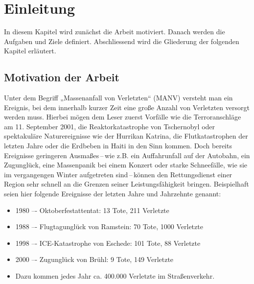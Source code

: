 \chapter{Einleitung}

In diesem Kapitel wird zunächst die Arbeit motiviert. Danach werden die Aufgaben und
Ziele definiert. Abschliessend wird die Gliederung der folgenden Kapitel erläutert.

\section{Motivation der Arbeit}
Unter dem Begriff „Massenanfall von Verletzten“ (MANV) versteht man ein Ereignis, bei dem innerhalb
kurzer Zeit eine große Anzahl von Verletzten versorgt werden muss. Hierbei mögen dem Leser zuerst
Vorfälle wie die Terroranschläge am 11. September 2001, die Reaktorkatastrophe von Tschernobyl oder
spektakuläre Naturereignisse wie der Hurrikan Katrina, die Flutkatastrophen der letzten Jahre oder die
Erdbeben in Haiti in den Sinn kommen.
Doch bereits Ereignisse geringeren Ausmaßes\,--\,wie z.B. ein Auffahrunfall auf der Autobahn, ein
Zugunglück, eine Massenpanik bei einem Konzert oder starke Schneefälle, wie sie im vergangengen
Winter aufgetreten sind\,--\,können den Rettungsdienst einer Region sehr schnell an die Grenzen seiner
Leistungsfähigkeit bringen.
Beispielhaft seien hier folgende Ereignisse der letzten Jahre und Jahrzehnte genannt:

\begin{itemize}
    \item 1980 –- Oktoberfestattentat: 13 Tote, 211 Verletzte
    \item 1988 –- Flugtagunglück von Ramstein: 70 Tote, 1000 Verletzte
    \item 1998 –- ICE-Katastrophe von Eschede: 101 Tote, 88 Verletzte
    \item 2000 –- Zugunglück von Brühl: 9 Tote, 149 Verletzte
    \item Dazu kommen jedes Jahr ca. 400.000 Verletzte im Straßenverkehr.
\end{itemize}

